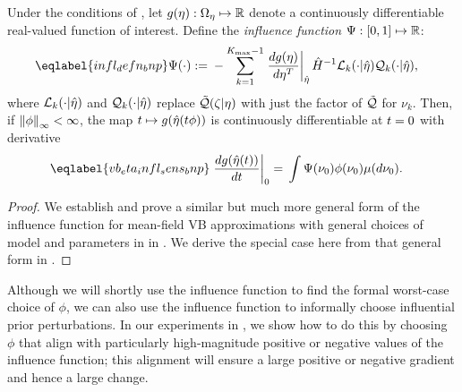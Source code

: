 %
\begin{cor}
%
Under the conditions of ,
let $g(\eta): \Omega_{\eta} \mapsto \mathbb{R}$ denote a
continuously differentiable real-valued function of interest.  Define the
\emph{influence function} $\Psi: [0,1] \mapsto \mathbb{R}$:
%
\begin{align} \eqlabel{infl_defn_bnp}
%
\infl(\cdot) :={}&
    - \sum_{k=1}^{\kmax-1} \fracat{d g(\eta)}{ d \eta^T}{\etaopt} \hessopt^{-1}
        \lqgradbark{\cdot \vert \etaopt}
        \qk(\cdot \vert \etaopt),
%
\end{align}
where $\mathcal{L}_k({\cdot \vert \hat\eta})$ and $\mathcal{Q}_k(\cdot \vert \hat\eta)$
replace $\tilde{\mathcal{Q}}(\zeta \vert \eta)$ with just the factor of $\tilde{\mathcal{Q}}$ for $\nu_k$.
%
Then, if $\left\Vert\phi\right\Vert_{\infty} < \infty$, the map $t \mapsto g(\hat\eta(t \phi))$ is
continuously differentiable at $t=0$ with derivative
%
\begin{align} \eqlabel{vb_eta_infl_sens_bnp}
%
\fracat{d g(\etaopt(\t))}{d \t}{0} ={}&
    \int \infl(\nu_0) \phi(\nu_0) \mu(d\nu_0).
%
\end{align}
\end{cor}
%
\begin{proof}
%
%
We establish and prove a similar but much more general form of the influence
function for mean-field VB approximations with general choices of model and
parameters in  in . We
derive the special case here from that general form in .
%
\end{proof}

Although we will shortly use the influence function to find the formal
worst-case choice of $\phi$, we can also use the influence function to
informally choose influential prior perturbations. In our experiments in
, we show how to do this by choosing $\phi$ that align with
particularly high-magnitude positive or negative values of the influence
function; this alignment will ensure a large positive or negative gradient and
hence a large change.

